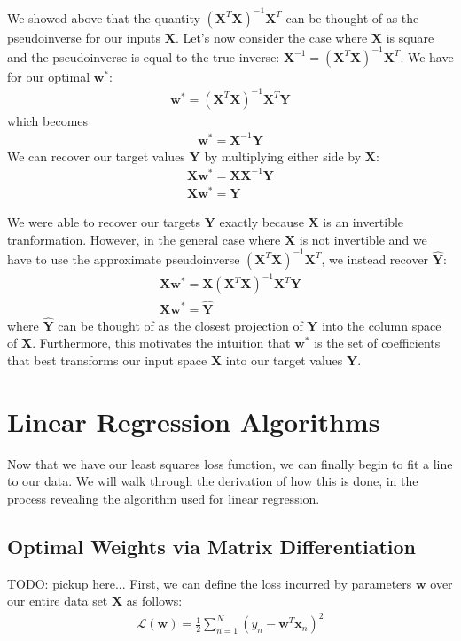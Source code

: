 We showed above that the quantity $(\textbf{X}^{T}\textbf{X})^{-1}\textbf{X}^{T}$ can be thought of as the pseudoinverse for our inputs $\textbf{X}$. Let's now consider the case where $\textbf{X}$ is square and the pseudoinverse is equal to the true inverse: $\textbf{X}^{-1} = (\textbf{X}^{T}\textbf{X})^{-1}\textbf{X}^{T}$. We have for our optimal $\textbf{w}^{*}$:
\begin{align*}
    \textbf{w}^{*} = (\textbf{X}^{T}\textbf{X})^{-1}\textbf{X}^{T}\textbf{Y}
\end{align*}
which becomes
\begin{align*}
    \textbf{w}^{*} = \textbf{X}^{-1}\textbf{Y}
\end{align*}
We can recover our target values $\textbf{Y}$ by multiplying either side by $\textbf{X}$:
\begin{align*}
    \textbf{X}\textbf{w}^{*} = \textbf{X}\textbf{X}^{-1}\textbf{Y} \\
    \textbf{X}\textbf{w}^{*} = \textbf{Y}
\end{align*}

We were able to recover our targets $\textbf{Y}$ exactly because $\textbf{X}$ is an invertible tranformation. However, in the general case where $\textbf{X}$ is not invertible and we have to use the approximate pseudoinverse $(\textbf{X}^{T}\textbf{X})^{-1}\textbf{X}^{T}$, we instead recover $\hat{\textbf{Y}}$:
\begin{align*}
    \textbf{X}\textbf{w}^{*} = \textbf{X}(\textbf{X}^{T}\textbf{X})^{-1}\textbf{X}^{T}\textbf{Y} \\
    \textbf{X}\textbf{w}^{*} = \hat{\textbf{Y}}
\end{align*}
where $\hat{\textbf{Y}}$ can be thought of as the closest projection of $\textbf{Y}$ into the column space of $\textbf{X}$. Furthermore, this motivates the intuition that $\textbf{w}^{*}$ is the set of coefficients that best transforms our input space $\textbf{X}$ into our target values $\textbf{Y}$.

\section{Linear Regression Algorithms}
Now that we have our least squares loss function, we can finally begin to fit a line to our data. We will walk through the derivation of how this is done, in the process revealing the algorithm used for linear regression.

\subsection{Optimal Weights via Matrix Differentiation}
TODO: pickup here...
First, we can define the loss incurred by parameters $\textbf{w}$ over our entire data set $\textbf{X}$ as follows:
\begin{align}
    \mathcal{L}(\textbf{w}) = \frac{1}{2} \sum_{n=1}^{N} (y_{n} - \textbf{w}^{T}\textbf{x}_{n})^2
\end{align}

